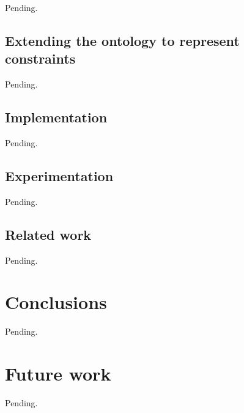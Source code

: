 \documentclass[a4paper, 10pt]{article}
\begin{document}
Pending.


\subsection{Extending the ontology to represent constraints}

Pending.


\subsection{Implementation}

Pending.


\subsection{Experimentation}

Pending.


\subsection{Related work}

Pending.


\section{Conclusions}

Pending.


\section{Future work}

Pending.


%
%
\end{document}
